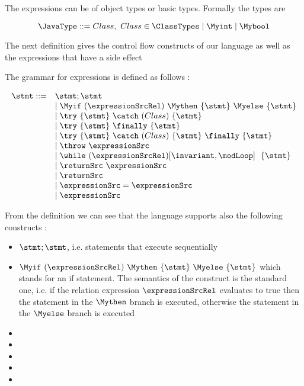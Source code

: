 The expressions can be of object types or basic types. Formally the types are 

$$
\JavaType ::= Class, \ Class \in \ClassTypes \mid \Myint \mid \Mybool
$$ 


The next definition gives the control flow constructs of our language as well as the expressions that have a side 
effect  
\begin{Statement}[Statement]
    The grammar for expressions  is defined as follows :
\end{Statement}
    $$ \begin{array} {ll}    \stmt ::=  
                                & \stmt;\stmt \\
                                & \mid \Myif \ (\expressionSrcRel) \ \Mythen \ \{ \stmt \} \  \Myelse \ \{ \stmt \}  \\
			        & \mid \try  \ \{ \stmt \}  \ \catch \ ( Class  )\ \{ \stmt \} \\
		                & \mid \try  \ \{ \stmt \} \ \finally \ \{ \stmt \} \\
				& \mid \try  \ \{ \stmt \} \ \catch \ ( Class )\ \{ \stmt \} \ \finally \ \{ \stmt \} \\
				& \mid \throw \ \expressionSrc  \\
                                & \mid \while \ (\expressionSrcRel) \lbrack \invariant, \modLoop \rbrack \ \do \ \{ \stmt \} \\
				& \mid \returnSrc \  \expressionSrc \\
				& \mid \returnSrc \\
                   		& \mid \expressionSrc = \expressionSrc \\
				& \mid \expressionSrc \\
			
			 \end{array} 
    $$



From the definition we can see that the language supports also the following constructs :

\begin{itemize}
   \item $\stmt;\stmt$, i.e. statements that execute sequentially 
   \item $\Myif \ (\expressionSrcRel) \ \Mythen \ \{ \stmt \} \  \Myelse \ \{ \stmt \}  $ which stands for
         an if statement. The semantics of the construct is the standard one, i.e. if the relation expression $\expressionSrcRel$ 
	 evaluates to true then the statement in the $ \Mythen$ branch is executed, otherwise the statement in the
	 $ \Myelse$ branch is executed
   \item  {}
   \item 
   \item 
   \item 
   \item 
  
 
\end{itemize}
